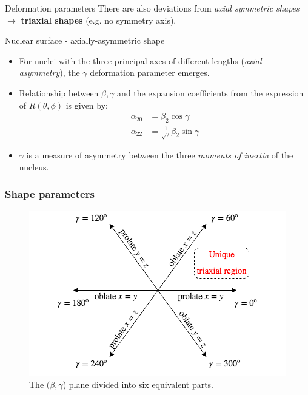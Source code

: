 \documentclass{beamer}
\begin{document}
\begin{frame}{Deformation parameters}
    There are also deviations from \emph{axial symmetric shapes} $\to$ \textbf{triaxial shapes} (e.g. no symmetry axis).
    \begin{block}{Nuclear surface - axially-asymmetric shape}
    \begin{itemize}
    \item For nuclei with the three principal axes of different lengths (\emph{axial asymmetry}), the $\gamma$ deformation parameter emerges.
    \item Relationship between $\beta,\gamma$ and the expansion coefficients from the expression of $R(\theta,\phi)$ is given by:
    \begin{align}
        \alpha_{20}&=\beta_2\cos\gamma\\
        \alpha_{22}&=\frac{1}{\sqrt{2}}\beta_2\sin\gamma
    \end{align}
    \item $\gamma$ is a measure of asymmetry between the three \textit{moments of inertia} of the nucleus.
    \end{itemize}
    \end{block}
\end{frame}

\begin{frame}
\frametitle{Shape parameters}
\begin{figure}
    \centering
    \includegraphics[scale=0.5]{figs/NuclearShapes1.png}
    \caption{The $(\beta,\gamma$) plane divided into six equivalent parts.}
    \label{fig:betagamma}
\end{figure}
\end{frame}
\end{document}
